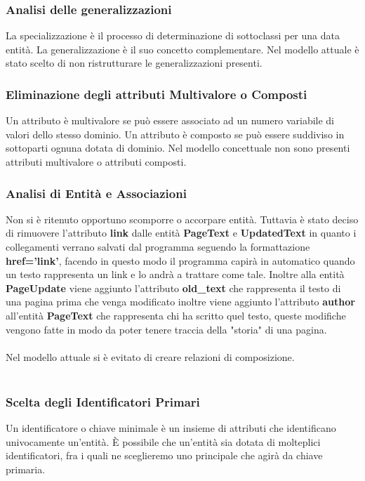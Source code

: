 \documentclass{article}
\begin{document}
{	{\subsubsection{Analisi delle generalizzazioni}}
	La specializzazione è il processo di determinazione di sottoclassi per una data
	entità. La generalizzazione è il suo concetto complementare.
	Nel modello attuale è stato scelto di non ristrutturare le generalizzazioni presenti.
	
	{\subsubsection{Eliminazione degli attributi Multivalore o Composti}}
	Un attributo è multivalore se può essere associato ad un numero variabile di
	valori dello stesso dominio. Un attributo è composto se può essere suddiviso
	in sottoparti ognuna dotata di dominio.
	Nel modello concettuale non sono presenti attributi multivalore o attributi composti.
	
	{\subsubsection{Analisi di Entità e Associazioni}}
	Non si è ritenuto opportuno scomporre o accorpare entità. Tuttavia è stato deciso di rimuovere l'attributo \textbf{link} dalle entità \textbf{PageText} e \textbf{UpdatedText} in quanto i collegamenti verrano salvati dal programma seguendo la formattazione \textbf{href='link'}, facendo in questo modo il programma capirà in automatico quando un testo rappresenta un link e lo andrà a trattare come tale. Inoltre alla entità \textbf{PageUpdate} viene aggiunto l'attributo \textbf{old\_text} che rappresenta il testo di una pagina prima che venga modificato inoltre viene aggiunto l'attributo \textbf{author} all'entit\`a \textbf{PageText} che rappresenta chi ha scritto quel testo, queste modifiche vengono fatte in modo da poter tenere traccia della "storia" di una pagina.
	\\
	\\	
	Nel modello attuale si è evitato di creare relazioni di composizione.
	\\\\
	{\subsubsection{Scelta degli Identificatori Primari}}
	Un identificatore o chiave minimale \`e un insieme di attributi che identificano univocamente un’entit\`a. \`E possibile che un’entit\`a sia dotata di molteplici identificatori, fra i quali ne sceglieremo uno principale che agir\`a da chiave primaria.
	
}
\end{document}
